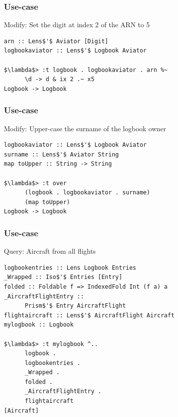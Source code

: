 \begin{frame}[fragile]
\frametitle{Use-case}
\begin{block}{Modify: Set the digit at index 2 of the ARN to 5}
\begin{lstlisting}[style=haskell,basicstyle=\scriptsize\ttfamily,mathescape]
arn :: Lens$'$ Aviator [Digit]
logbookaviator :: Lens$'$ Logbook Aviator

$\lambda$> :t logbook . logbookaviator . arn %~
      \d -> d & ix 2 .~ x5
Logbook -> Logbook
\end{lstlisting}
\end{block}
\end{frame}

\begin{frame}[fragile]
\frametitle{Use-case}
\begin{block}{Modify: Upper-case the surname of the logbook owner}
\begin{lstlisting}[style=haskell,basicstyle=\scriptsize\ttfamily,mathescape]
logbookaviator :: Lens$'$ Logbook Aviator
surname :: Lens$'$ Aviator String
map toUpper :: String -> String

$\lambda$> :t over
      (logbook . logbookaviator . surname)
      (map toUpper)
Logbook -> Logbook
\end{lstlisting}
\end{block}
\end{frame}

\begin{frame}[fragile]
\frametitle{Use-case}
\begin{block}{Query: Aircraft from all flights}
\begin{lstlisting}[style=haskell,basicstyle=\scriptsize\ttfamily,mathescape]
logbookentries :: Lens Logbook Entries
_Wrapped :: Iso$'$ Entries [Entry]
folded :: Foldable f => IndexedFold Int (f a) a 
_AircraftFlightEntry ::
      Prism$'$ Entry AircraftFlight
flightaircraft :: Lens$'$ AircraftFlight Aircraft
mylogbook :: Logbook

$\lambda$> :t mylogbook ^..
      logbook .
      logbookentries .
      _Wrapped .
      folded .
      _AircraftFlightEntry .
      flightaircraft
[Aircraft]
\end{lstlisting}
\end{block}
\end{frame}


